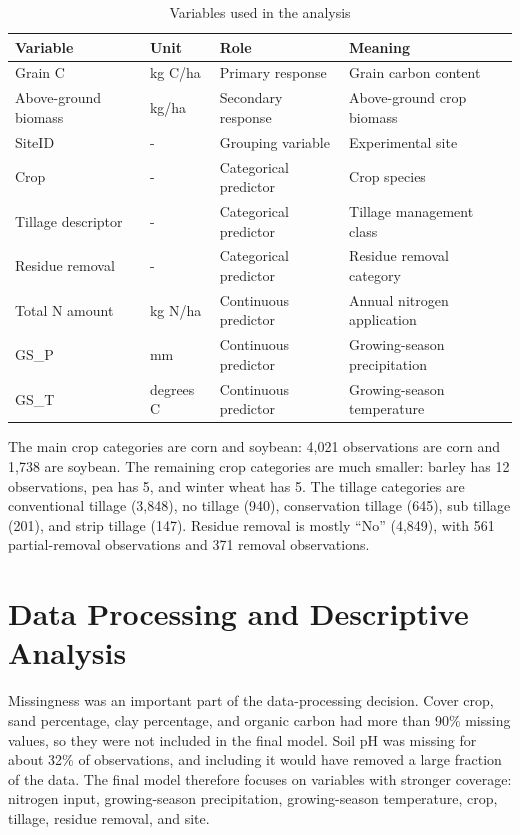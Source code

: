 \documentclass[11pt]{article}
\begin{document}
\begin{table}[H]
\centering
\caption{Variables used in the analysis}
\label{tab:variables}
\begin{tabular}{llll}
\toprule
Variable & Unit & Role & Meaning \\
\midrule
Grain C & kg C/ha & Primary response & Grain carbon content \\
Above-ground biomass & kg/ha & Secondary response & Above-ground crop biomass \\
SiteID & - & Grouping variable & Experimental site \\
Crop & - & Categorical predictor & Crop species \\
Tillage descriptor & - & Categorical predictor & Tillage management class \\
Residue removal & - & Categorical predictor & Residue removal category \\
Total N amount & kg N/ha & Continuous predictor & Annual nitrogen application \\
GS\_P & mm & Continuous predictor & Growing-season precipitation \\
GS\_T & degrees C & Continuous predictor & Growing-season temperature \\
\bottomrule
\end{tabular}
\end{table}

The main crop categories are corn and soybean: 4,021 observations are corn and 1,738 are soybean. The remaining crop categories are much smaller: barley has 12 observations, pea has 5, and winter wheat has 5. The tillage categories are conventional tillage (3,848), no tillage (940), conservation tillage (645), sub tillage (201), and strip tillage (147). Residue removal is mostly ``No'' (4,849), with 561 partial-removal observations and 371 removal observations.

\section{Data Processing and Descriptive Analysis}

Missingness was an important part of the data-processing decision. Cover crop, sand percentage, clay percentage, and organic carbon had more than 90\% missing values, so they were not included in the final model. Soil pH was missing for about 32\% of observations, and including it would have removed a large fraction of the data. The final model therefore focuses on variables with stronger coverage: nitrogen input, growing-season precipitation, growing-season temperature, crop, tillage, residue removal, and site.
\end{document}
